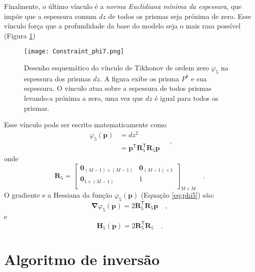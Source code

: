 Finalmente, o último vínculo é a \textit{norma Euclidiana mínima da espessura}, que impõe que a espessura comum $ dz $ de todos os prismas seja próxima de zero. Esse vínculo força que a profundidade da base do modelo seja o mais rasa possível (Figura \ref{fig:phi5})

\begin{figure}[!htb]
	\centering
	\texttt{[image: Constraint\_phi7.png]}
	\caption{Desenho esquemático do vínculo de Tikhonov de ordem zero $\varphi_{5}$ na espessura dos prismas $dz$. A figura exibe os prisma $P^k$ e sua espessura. O vínculo atua sobre a espessura de todos prismas levando-a próxima a zero, uma vez que $dz$ é igual para todos os prismas.}
	\label{fig:phi5}
\end{figure}

Esse vínculo pode ser escrito matematicamente como
\begin{equation}\label{eq:phi5}
\begin{split}
\varphi_{5}(\mathbf{p}) &= dz^2 \\
&= \mathbf{p}^{\mathsf{T}} \mathbf{R}_{5}^{\mathsf{T}} \mathbf{R}_{5} \mathbf{p}
\end{split} \quad ,
\end{equation}
onde
\begin{equation}
\mathbf{R}_{5} =
\begin{bmatrix}
\mathbf{0}_{(M-1) \times (M-1)} & \mathbf{0}_{(M-1) \times 1} \\
\mathbf{0}_{1 \times (M-1)} & 1 \\
\end{bmatrix}_{ M \times M } \quad .
\end{equation}
O gradiente e a Hessiana da função $\varphi_{5}(\mathbf{p})$ (Equação \ref{eq:phi5}) são:
\begin{equation}\label{eq:phi5_grad}
\boldsymbol{\nabla}\varphi_{5}(\mathbf{p}) = 2 \mathbf{R}_{5}^{\mathsf{T}} \mathbf{R}_{5} \mathbf{p} \quad ,
\end{equation}
e
\begin{equation}\label{eq:phi5_hessian}
\mathbf{H}_{5}(\mathbf{p}) = 2 \mathbf{R}^{\mathsf{T}}_{5}\mathbf{R}_{5} \quad .
\end{equation}

\section{Algoritmo de inversão}

